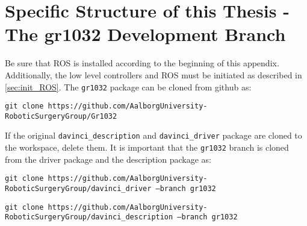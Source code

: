 \section{Specific Structure of this Thesis - The gr1032 Development Branch}\label{appsec:ros_development}
Be sure that ROS is installed according to the beginning of this appendix. Additionally, the low level controllers and ROS must be initiated as described in \autoref{sec:init_ROS}. The \texttt{gr1032} package can be cloned from github as:

\hspace{0.0cm}  \texttt{git clone https://github.com/AalborgUniversity-RoboticSurgeryGroup/Gr1032}

If the original \texttt{davinci\_description} and \texttt{davinci\_driver} package are cloned to the workspace, delete them. It is important that the \texttt{gr1032} branch is cloned from the driver package and the description package as:

\hspace{0.0cm}  \texttt{git clone https://github.com/AalborgUniversity-RoboticSurgeryGroup/davinci\_driver ---branch gr1032}

\hspace{0.0cm}  \texttt{git clone https://github.com/AalborgUniversity-RoboticSurgeryGroup/davinci\_description ---branch gr1032}

